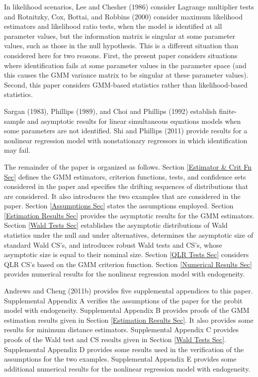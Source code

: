 \documentclass[12pt,titlepage,final,oneside,letterpaper]{article}
\begin{document}
In likelihood scenarios, Lee and Chesher (1986) consider Lagrange multiplier
tests and Rotnitzky, Cox, Bottai, and Robbins (2000) consider maximum
likelihood estimators and likelihood ratio tests, when the model is
identified at all parameter values, but the information matrix is singular
at some parameter values, such as those in the null hypothesis. This is a
different situation than considered here for two reasons. First, the present
paper considers situations where identification fails at some parameter
values in the parameter space (and this causes the GMM variance matrix to be
singular at these parameter values). Second, this paper considers GMM-based
statistics rather than likelihood-based statistics.

Sargan (1983), Phillips (1989), and Choi and Phillips (1992) establish
finite-sample and asymptotic results for linear simultaneous equations
models when some parameters are not identified. Shi and Phillips (2011)
provide results for a nonlinear regression model with nonstationary
regressors in which identification may fail.

The remainder of the paper is organized as follows. Section \ref{Estimator &
Crit Fn Sec} defines the GMM estimators, criterion functions, tests, and
confidence sets considered in the paper and specifies the drifting sequences
of distributions that are considered. It also introduces the two examples
that are considered in the paper. Section \ref{Assumptions Sec} states the
assumptions employed. Section \ref{Estimation Results Sec} provides the
asymptotic results for the GMM estimators. Section \ref{Wald Tests Sec}
establishes the asymptotic distributions of Wald statistics under the null
and under alternatives, determines the asymptotic size of standard Wald
CS's, and introduces robust Wald tests and CS's, whose asymptotic size is
equal to their nominal size. Section \ref{QLR Tests Sec} considers QLR CS's
based on the GMM criterion function. Section \ref{Numerical Results Sec}
provides numerical results for the nonlinear regression model with
endogeneity.

Andrews and Cheng (2011b) provides five supplemental appendices to this
paper. Supplemental Appendix A verifies the assumptions of the paper for the
probit model with endogeneity. Supplemental Appendix B provides proofs of
the GMM estimation results given in Section \ref{Estimation Results Sec}. It
also provides some results for minimum distance estimators. Supplemental
Appendix C provides proofs of the Wald test and CS results given in Section %
\ref{Wald Tests Sec}. Supplemental Appendix D provides some results used in
the verification of the assumptions for the two examples. Supplemental
Appendix E provides some additional numerical results for the nonlinear
regression model with endogeneity.
\end{document}
